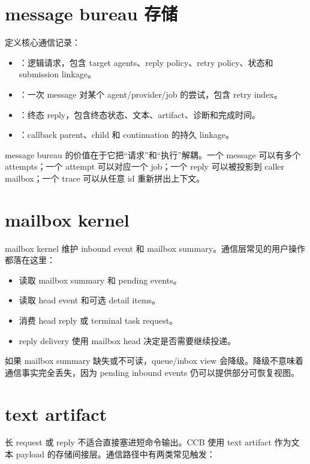 \section{message bureau 存储}

 定义核心通信记录：

\begin{itemize}
  \item {}：逻辑请求，包含 target agents、reply policy、retry policy、状态和 submission linkage。
  \item {}：一次 message 对某个 agent/provider/job 的尝试，包含 retry index。
  \item {}：终态 reply，包含终态状态、文本、artifact、诊断和完成时间。
  \item {}：callback parent、child 和 continuation 的持久 linkage。
\end{itemize}

message bureau 的价值在于它把“请求”和“执行”解耦。一个 message 可以有多个 attempts；一个 attempt 可以对应一个 job；一个 reply 可以被投影到 caller mailbox；一个 trace 可以从任意 id 重新拼出上下文。

\section{mailbox kernel}

mailbox kernel 维护 inbound event 和 mailbox summary。通信层常见的用户操作都落在这里：

\begin{itemize}
  \item {} 读取 mailbox summary 和 pending events。
  \item {} 读取 head event 和可选 detail items。
  \item {} 消费 head reply 或 terminal task request。
  \item reply delivery 使用 mailbox head 决定是否需要继续投递。
\end{itemize}

如果 mailbox summary 缺失或不可读，queue/inbox view 会降级。降级不意味着通信事实完全丢失，因为 pending inbound events 仍可以提供部分可恢复视图。

\section{text artifact}

长 request 或 reply 不适合直接塞进短命令输出。CCB 使用 text artifact 作为文本 payload 的存储间接层。通信路径中有两类常见触发：

